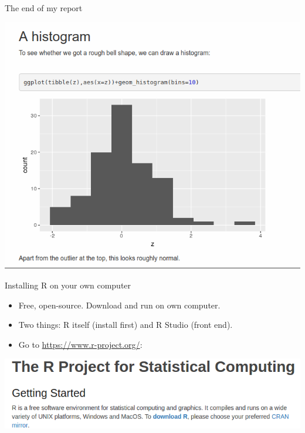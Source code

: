 \documentclass[ignorenonframetext,]{beamer}
\providecommand{\tightlist}{%
  \setlength{\itemsep}{0pt}\setlength{\parskip}{0pt}}
\begin{document}
\begin{frame}{The end of my report}
\protect\hypertarget{the-end-of-my-report}{}

\includegraphics{Screenshot_2018-06-29_17-09-23.png}

\end{frame}

\begin{frame}{Installing R on your own computer}
\protect\hypertarget{installing-r-on-your-own-computer}{}

\begin{itemize}
\tightlist
\item
  Free, open-source. Download and run on own computer.
\item
  Two things: R itself (install first) and R Studio (front end).
\item
  Go to \url{https://www.r-project.org/}:
\end{itemize}

\includegraphics{r30.png}

\end{frame}
\end{document}
